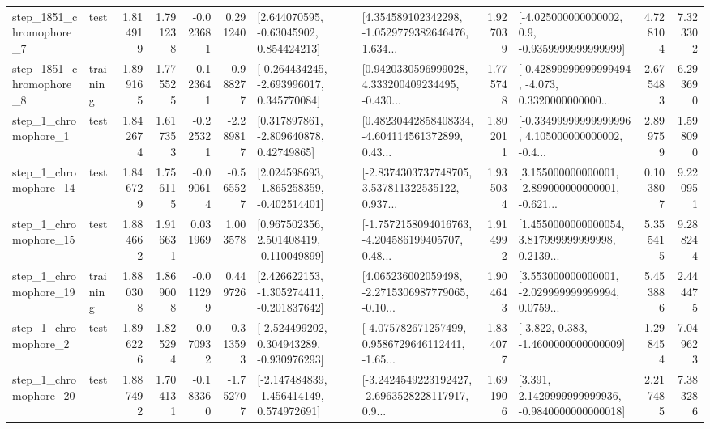 \begin{tabular}{llrrrrllrlrr}
  step\_1851\_chromophore\_7 &      test &      1.814919 &    1.791238 &     -0.023681 &  0.291240 &     [2.644070595, -0.63045902, 0.854424213] &  [4.354589102342298, -1.0529779382646476, 1.634... &       1.927039 &     [-4.025000000000002, 0.9, -0.9359999999999999] &            4.728104 &          7.323302 \\
  step\_1851\_chromophore\_8 &  training &      1.899165 &    1.775525 &     -0.123641 & -0.988277 &   [-0.264434245, -2.693996017, 0.345770084] &  [0.9420330596999028, 4.333200409234495, -0.430... &       1.775748 &  [-0.42899999999999494, -4.073, 0.3320000000000... &            2.675483 &          6.293690 \\
     step\_1\_chromophore\_1 &      test &      1.842674 &    1.617353 &     -0.225321 & -2.289817 &     [0.317897861, -2.809640878, 0.42749865] &  [0.48230442858408334, -4.604114561372899, 0.43... &       1.802011 &  [-0.33499999999999996, 4.105000000000002, -0.4... &            2.899759 &          1.598090 \\
    step\_1\_chromophore\_14 &      test &      1.846729 &    1.756115 &     -0.090614 & -0.565527 &   [2.024598693, -1.865258359, -0.402514401] &  [-2.8374303737748705, 3.537811322535122, 0.937... &       1.935034 &  [3.155000000000001, -2.899000000000001, -0.621... &            0.103807 &          9.220951 \\
    step\_1\_chromophore\_15 &      test &      1.884662 &    1.916631 &      0.031969 &  1.003578 &    [0.967502356, 2.501408419, -0.110049899] &  [-1.7572158094016763, -4.204586199405707, 0.48... &       1.914992 &  [1.4550000000000054, 3.817999999999998, 0.2139... &            5.355415 &          9.288244 \\
    step\_1\_chromophore\_19 &  training &      1.880308 &    1.869008 &     -0.011299 &  0.449726 &   [2.426622153, -1.305274411, -0.201837642] &  [4.065236002059498, -2.2715306987779065, -0.10... &       1.904643 &  [3.553000000000001, -2.029999999999994, 0.0759... &            5.453886 &          2.444475 \\
     step\_1\_chromophore\_2 &      test &      1.896226 &    1.825294 &     -0.070932 & -0.313593 &   [-2.524499202, 0.304943289, -0.930976293] &  [-4.075782671257499, 0.9586729646112441, -1.65... &       1.834077 &               [-3.822, 0.383, -1.4600000000000009] &            1.298454 &          7.049623 \\
    step\_1\_chromophore\_20 &      test &      1.887492 &    1.704131 &     -0.183360 & -1.752707 &   [-2.147484839, -1.456414149, 0.574972691] &  [-3.2424549223192427, -2.6963528228117917, 0.9... &       1.691906 &   [3.391, 2.1429999999999936, -0.9840000000000018] &            2.217485 &          7.383286 \\

\end{tabular}
